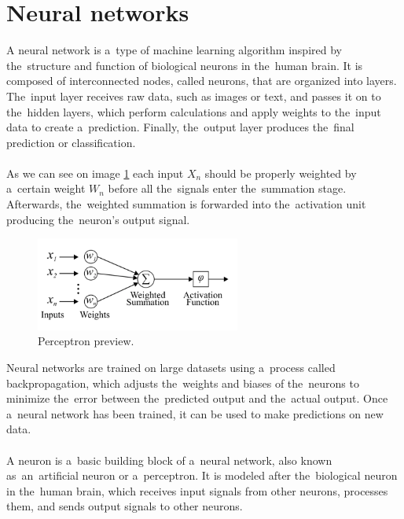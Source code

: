 \documentclass[12pt]{article}
\begin{document}
    \section{Neural networks} \label{sec:nn}
    A neural network is a~type of machine learning algorithm inspired by the~structure and function of biological neurons in the~human brain. It is composed of interconnected nodes, called neurons, that are organized into layers. The~input layer receives raw data, such as images or text, and passes it on to the~hidden layers, which perform calculations and apply weights to the~input data to create a~prediction. Finally, the~output layer produces the~final prediction or classification.\\
    \\
    As we can see on image \ref{fig:perceptron} each input $X_n$ should be properly weighted by a~certain weight $W_n$ before all the~signals enter the~summation stage. Afterwards, the~weighted summation is forwarded into the~activation unit producing the~neuron’s output signal.
    \begin{center}
        \begin{figure}[!ht]
            \centering
            \includegraphics[width=0.6\textwidth]{figures/nn}
            \caption{Perceptron preview. \cite{Mourgias-Alexandris:19}}
            \label{fig:perceptron}
        \end{figure}
    \end{center}
    Neural networks are trained on large datasets using a~process called backpropagation, which adjusts the~weights and biases of the~neurons to minimize the~error between the~predicted output and the~actual output. Once a~neural network has been trained, it can be used to make predictions on new data.\\
    \\
    A neuron is a~basic building block of a~neural network, also known as~an~artificial neuron or a~perceptron.
It is modeled after the~biological neuron in the~human brain, which receives input signals from other neurons,
processes them, and sends output signals to other neurons.\\
\end{document}
